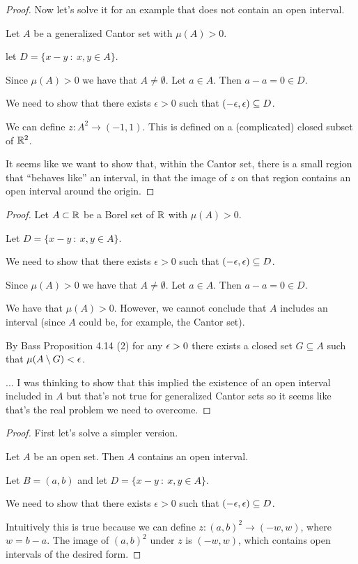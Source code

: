 \begin{proof}
  Now let's solve it for an example that does not contain an open interval.

  Let $A$ be a generalized Cantor set with $\mu(A) > 0$.

  let $D = \big\{ x - y ~:~ x, y \in A\big\}$.

  Since $\mu(A) > 0$ we have that $A \neq \emptyset$. Let $a \in A$. Then $a - a = 0 \in D$.

  We need to show that there exists $\epsilon > 0$ such that $(-\epsilon, \epsilon) \subseteq D$.

  We can define $z: A^2 \to (-1, 1)$. This is defined on a (complicated) closed subset of $\mathbb{R}^2$.

  It seems like we want to show that, within the Cantor set, there is a small region that ``behaves like​'' an
  interval, in that the image of $z$ on that region contains an open interval around the origin.
\end{proof}


\begin{proof}
  Let $A \subset \mathbb{R}$ be a Borel set of $\mathbb{R}$ with $\mu(A) > 0$.

  Let $D = \big\{ x - y ~:~ x, y \in A\big\}$.

  We need to show that there exists $\epsilon > 0$ such that $(-\epsilon, \epsilon) \subseteq D$.

  Since $\mu(A) > 0$ we have that $A \neq \emptyset$. Let $a \in A$. Then $a - a = 0 \in D$.

  We have that $\mu(A) > 0$. However, we cannot conclude that $A$ includes an interval (since $A$ could be, for
  example, the Cantor set).

  By Bass Proposition 4.14 (2) for any $\epsilon > 0$ there exists a closed set $G \subseteq A$ such that $\mu(A \setminus G) < \epsilon$.

  ... I was thinking to show that this implied the existence of an open interval included in $A$ but that's not
  true for generalized Cantor sets so it seems like that's the real problem we need to overcome.
\end{proof}


\begin{proof}
  First let's solve a simpler version.

  Let $A$ be an open set. Then $A$ contains an open interval.

  Let $B = (a, b)$ and let $D = \big\{ x - y ~:~ x, y \in A\big\}$.

  We need to show that there exists $\epsilon > 0$ such that $(-\epsilon, \epsilon) \subseteq D$.

  Intuitively this is true because we can define $z:(a, b)^2 \to (-w, w)$, where $w = b - a$. The image
  of $(a, b)^2$ under $z$ is $(-w, w)$, which contains open intervals of the desired form.
\end{proof}




